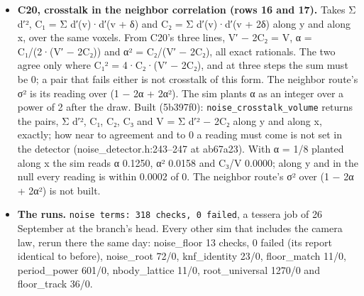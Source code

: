 \begin{enumerate}
\begin{itemize}
\item \textbf{C20, crosstalk in the neighbor correlation (rows 16 and 17).} Takes Σ d′², C₁ = Σ d′(v)·d′(v + δ) and C₂ = Σ d′(v)·d′(v + 2δ) along y and along x, over the same voxels. From C20's three lines, V′ − 2C₂ = V, α = C₁/(2·(V′ − 2C₂)) and α² = C₂/(V′ − 2C₂), all exact rationals. The two agree only where C₁² = 4·C₂·(V′ − 2C₂), and at three steps the sum must be 0; a pair that fails either is not crosstalk of this form. The neighbor route's σ² is its reading over (1 − 2α + 2α²). The sim plants α as an integer over a power of 2 after the draw. Built (5b397f0): \texttt{noise\_\allowbreak{}crosstalk\_\allowbreak{}volume} returns the pairs, Σ d′², C₁, C₂, C₃ and V = Σ d′² − 2C₂ along y and along x, exactly; how near to agreement and to 0 a reading must come is not set in the detector (noise\_\allowbreak{}detector.h:243–247 at ab67a23). With α = 1/8 planted along x the sim reads α 0.1250, α² 0.0158 and C₃/V 0.0000; along y and in the null every reading is within 0.0002 of 0. The neighbor route's σ² over (1 − 2α + 2α²) is not built.
\item \textbf{The runs.} \texttt{noise terms: 318 checks, 0 failed}, a tessera job of 26 September at the branch's head. Every other sim that includes the camera law, rerun there the same day: noise\_\allowbreak{}floor 13 checks, 0 failed (its report identical to before), noise\_\allowbreak{}root 72/0, knf\_\allowbreak{}identity 23/0, floor\_\allowbreak{}match 11/0, period\_\allowbreak{}power 601/0, nbody\_\allowbreak{}lattice 11/0, root\_\allowbreak{}universal 1270/0 and floor\_\allowbreak{}track 36/0.
\end{itemize}
\end{enumerate}
